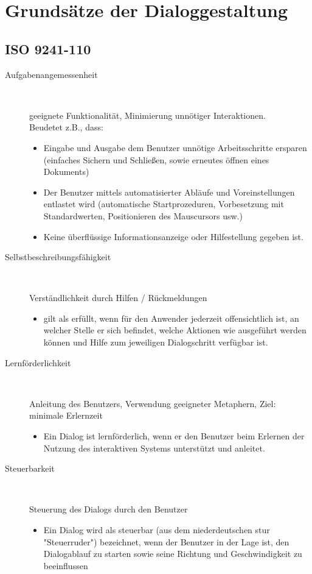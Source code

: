 \documentclass{report}
\begin{document}
\newpage

\section*{Grundsätze der Dialoggestaltung}
\subsection*{ISO 9241-110}
\begin{description}
\item[Aufgabenangemessenheit]~\par
geeignete Funktionalität, Minimierung unnötiger Interaktionen.\\Beudetet z.B., dass:
\begin{itemize}
    \item Eingabe und Ausgabe dem Benutzer unnötige Arbeitsschritte ersparen (einfaches Sichern und Schließen, sowie erneutes öffnen eines Dokuments)
    \item Der Benutzer mittels automatisierter Abläufe und Voreinstellungen entlastet wird (automatische Startprozeduren, Vorbesetzung mit Standardwerten, Positionieren des Mauscursors usw.)
    \item Keine überflüssige Informationsanzeige oder Hilfestellung gegeben ist.
\end{itemize}

\item[Selbstbeschreibungsfähigkeit]~\par
Verständlichkeit durch Hilfen / Rückmeldungen
\begin{itemize}
\item gilt als erfüllt, wenn für den Anwender jederzeit offensichtlich ist, an welcher Stelle er sich befindet, welche Aktionen wie ausgeführt werden können und Hilfe zum jeweiligen Dialogschritt verfügbar ist.
\end{itemize}

\item[Lernförderlichkeit]~\par
Anleitung des Benutzers, Verwendung geeigneter Metaphern, Ziel: minimale Erlernzeit
\begin{itemize}
\item Ein Dialog ist lernförderlich, wenn er den Benutzer beim Erlernen der Nutzung des interaktiven Systems unterstützt und anleitet.
\end{itemize}

\item[Steuerbarkeit]~\par
Steuerung des Dialogs durch den Benutzer
\begin{itemize}
\item Ein Dialog wird als steuerbar (aus dem niederdeutschen stur "Steuerruder") bezeichnet, wenn der Benutzer in der Lage ist, den Dialogablauf zu starten sowie seine Richtung und Geschwindigkeit zu beeinflussen
\end{itemize}


\end{description}
\end{document}
